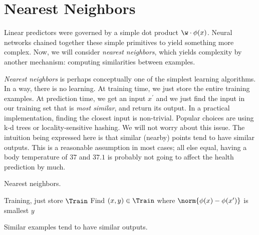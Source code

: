 


\section{Nearest Neighbors} %
\label{sec:nearest_neighbors}

Linear predictors were governed by a simple dot product $\w \cdot \phi(x)$.
%
Neural networks chained together these simple primitives to yield something more complex.
%
Now, we will consider \textit{nearest neighbors}, which yields complexity by another mechanism:
%
computing similarities between examples.

\textit{Nearest neighbors} is perhaps conceptually one of the simplest learning algorithms.
%
In a way, there is no learning.  At training time, we just store the entire training examples.
%
At prediction time, we get an input $x^\prime$ and we just find the input in our training set that is \textit{most similar}, and return its output.
%
In a practical implementation, finding the closest input is non-trivial.
%
Popular choices are using k-d trees or locality-sensitive hashing.  We will not worry about this issue.
%
The intuition being expressed here is that similar (nearby) points tend to have similar outputs.
%
This is a reasonable assumption in most cases; all else equal, having a body temperature of $37$ and $37.1$
%
is probably not going to affect the health prediction by much.


\begin{algorithm}[ht]
  \caption{Nearest neighbors.}
  \begin{algorithmic}
	\State Training, just store $\Train$
		\State Find $(x,y) \in \Train$ where $\norm{\phi(x) - \phi(x^\prime)}$ is smallest
		\State \Return $y$
	  \EndFor
  \EndFunction
  \end{algorithmic}
   Similar examples tend to have similar outputs.
\end{algorithm}



